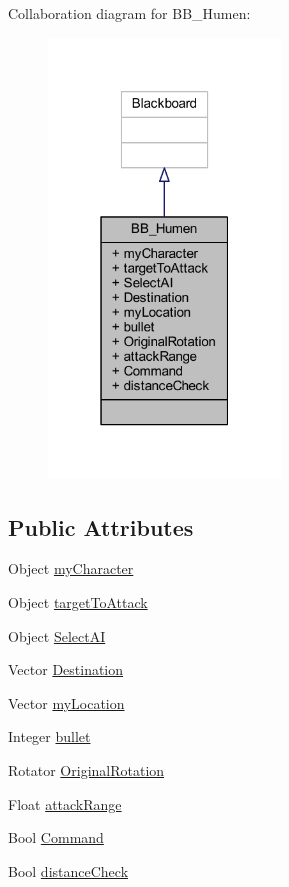 Collaboration diagram for B\+B\+\_\+\+Humen\+:
\nopagebreak
\begin{figure}[H]
\begin{center}
\leavevmode
\includegraphics[width=175pt]{class_b_b___humen__coll__graph}
\end{center}
\end{figure}
\subsection*{Public Attributes}
\begin{DoxyCompactItemize}
\item 
Object \hyperlink{class_b_b___humen_a7f9491363e6d98dd20be54751e78c76b}{my\+Character}
\item 
Object \hyperlink{class_b_b___humen_a4d3316519116e095dd0b34472b5f24d4}{target\+To\+Attack}
\item 
Object \hyperlink{class_b_b___humen_a6a1bca9746fc00983e69bc821ccdeda7}{Select\+AI}
\item 
Vector \hyperlink{class_b_b___humen_a52f772a3da5b3c23c6ff239571573a10}{Destination}
\item 
Vector \hyperlink{class_b_b___humen_a135f2ee9b81ee3285d27e52ecf2c147c}{my\+Location}
\item 
Integer \hyperlink{class_b_b___humen_a87f003bcd85b60d96e6ef1ebab51976e}{bullet}
\item 
Rotator \hyperlink{class_b_b___humen_af8860690e8fc6772d27a923223e424ec}{Original\+Rotation}
\item 
Float \hyperlink{class_b_b___humen_a9fb506718878e67dd7ce4889188fd9c3}{attack\+Range}
\item 
Bool \hyperlink{class_b_b___humen_a5f3cc37acdcbf06281e92a1792354864}{Command}
\item 
Bool \hyperlink{class_b_b___humen_a4f067f9c00145461036a0419a631dd06}{distance\+Check}
\end{DoxyCompactItemize}


